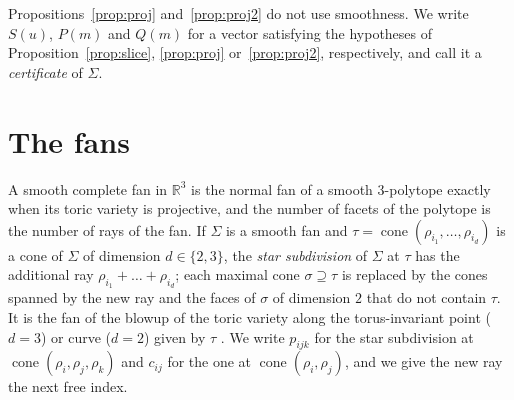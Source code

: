 \documentclass[12pt]{article}
\newcommand{\R}{\mathbb{R}}
\newcommand{\cone}{\operatorname{cone}}
\begin{document}
Propositions~\ref{prop:proj} and~\ref{prop:proj2} do not use smoothness. We write $S(u)$, $P(m)$ and $Q(m)$ for a vector satisfying the hypotheses of Proposition~\ref{prop:slice}, \ref{prop:proj} or~\ref{prop:proj2}, respectively, and call it a \emph{certificate} of $\Sigma$.

\section{The fans}\label{sec:classification}

A smooth complete fan in $\R^3$ is the normal fan of a smooth $3$-polytope exactly when its toric variety is projective, and the number of facets of the polytope is the number of rays of the fan. If $\Sigma$ is a smooth fan and $\tau=\cone(\rho_{i_1},\dots,\rho_{i_d})$ is a cone of $\Sigma$ of dimension $d\in\{2,3\}$, the \emph{star subdivision} of $\Sigma$ at $\tau$ has the additional ray $\rho_{i_1}+\dots+\rho_{i_d}$; each maximal cone $\sigma\supseteq\tau$ is replaced by the cones spanned by the new ray and the faces of $\sigma$ of dimension $2$ that do not contain $\tau$. It is the fan of the blowup of the toric variety along the torus-invariant point ($d=3$) or curve ($d=2$) given by $\tau$ \cite[Section~3.3]{CLS11}. We write $p_{ijk}$ for the star subdivision at $\cone(\rho_i,\rho_j,\rho_k)$ and $c_{ij}$ for the one at $\cone(\rho_i,\rho_j)$, and we give the new ray the next free index.
\end{document}
